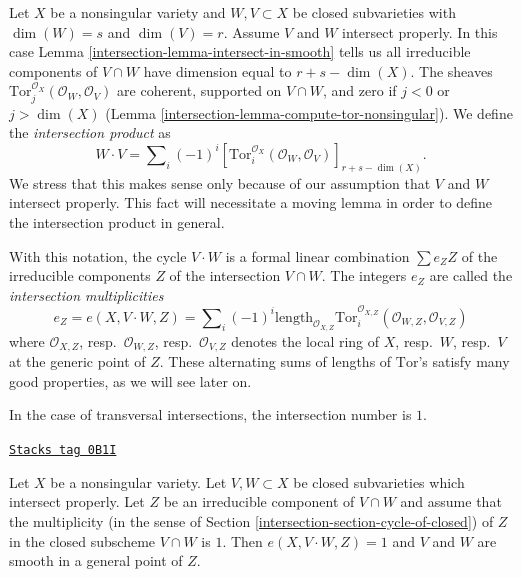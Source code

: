 Let $X$ be a nonsingular variety and $W, V \subset X$
be closed subvarieties with $\dim(W) = s$ and $\dim(V) = r$.
Assume $V$ and $W$ intersect properly.
In this case Lemma \ref{intersection-lemma-intersect-in-smooth} tells us all irreducible
components of $V \cap W$ have dimension equal to $r + s - \dim(X)$.
The sheaves $\text{Tor}_j^{\mathcal{O}_X}(\mathcal{O}_W, \mathcal{O}_V)$ are
coherent, supported on $V \cap W$, and zero if $j < 0$ or $j > \dim(X)$
(Lemma \ref{intersection-lemma-compute-tor-nonsingular}).
We define the {\it intersection product} as
$$
W \cdot V = \sum\nolimits_i (-1)^i
[\text{Tor}_i^{\mathcal{O}_X}(\mathcal{O}_W, \mathcal{O}_V)]_{r + s - \dim(X)}.
$$
We stress that this makes sense only because of our assumption that
$V$ and $W$ intersect properly. This fact will necessitate a moving
lemma in order to define the intersection product in general.

\medskip\noindent
With this notation, the cycle $V \cdot W$ is a formal linear
combination $\sum e_Z Z$ of the irreducible components $Z$
of the intersection $V \cap W$. The integers $e_Z$ are called
the {\it intersection multiplicities}
$$
e_Z = e(X, V \cdot W, Z) =
\sum\nolimits_i
(-1)^i
\text{length}_{\mathcal{O}_{X, Z}}
\text{Tor}_i^{\mathcal{O}_{X, Z}}(\mathcal{O}_{W, Z}, \mathcal{O}_{V, Z})
$$
where $\mathcal{O}_{X, Z}$, resp.\ $\mathcal{O}_{W, Z}$,
resp.\ $\mathcal{O}_{V, Z}$ denotes the local ring of $X$, resp.\ $W$,
resp.\ $V$ at the generic point of $Z$.
These alternating sums of lengths of $\text{Tor}$'s satisfy many good
properties, as we will see later on.

\medskip\noindent
In the case of transversal intersections, the intersection number is $1$.

\begin{lemma}[Transversal]
\label{intersection-lemma-transversal}
\href{https://stacks.math.columbia.edu/tag/0B1I}{\texttt{Stacks tag 0B1I}}

Let $X$ be a nonsingular variety. Let $V, W \subset X$ be
closed subvarieties which intersect properly. Let $Z$ be an irreducible
component of $V \cap W$ and assume that the multiplicity
(in the sense of Section \ref{intersection-section-cycle-of-closed}) of $Z$
in the closed subscheme $V \cap W$ is $1$.
Then $e(X, V \cdot W, Z) = 1$ and $V$ and $W$ are smooth
in a general point of $Z$.
\end{lemma}

